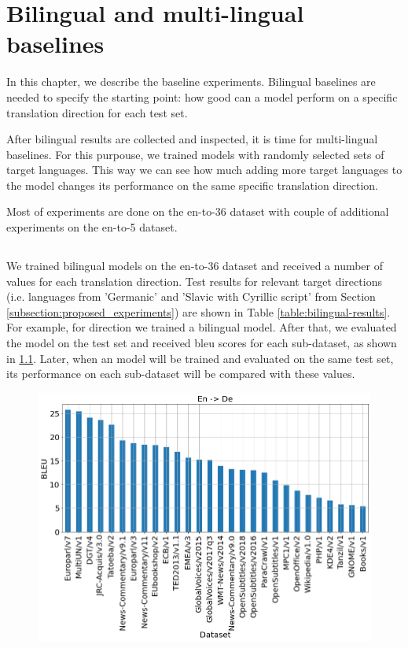 \chapter{Bilingual and multi-lingual baselines}

In this chapter, we describe the baseline experiments.
Bilingual baselines are needed to specify the starting point:
how good can a model perform on a specific translation direction
for each test set.

After bilingual results are collected and inspected, it is time for
multi-lingual baselines. For this purpouse, we trained models
with randomly selected sets of target languages.
This way we can see how much adding more target languages to the model
changes its performance on the same specific translation direction.

Most of experiments are done on the \gls{en-to-36} dataset with couple of
additional experiments on the \gls{en-to-5} dataset.


\section{}
\label{section:bilingual_baseline}


We trained bilingual models on the \gls{en-to-36} dataset and received
a number of values for each translation direction.
Test results for relevant target directions (i.e. languages from
'Germanic' and 'Slavic with Cyrillic script'
from Section \ref{subsection:proposed_experiments})
are shown in Table \ref{table:bilingual-results}.
For example, for  direction we trained a bilingual model.
After that, we evaluated the model on the test set and received
\acrshort{bleu} scores for each sub-dataset, as shown
in \cref{fig:bilingual_en_de}.
Later, when an  model will be trained and evaluated
on the same test set, its  performance on each sub-dataset
will be compared with these values.

\begin{figure}[h]
	\centering
	\includegraphics[width=0.9\columnwidth]{../img/bilingual_en_de.png}
	\label{fig:bilingual_en_de}
\end{figure}

